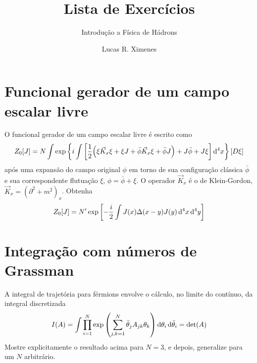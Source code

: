 \documentclass[a4paper, 11pt, oneside]{impression}
\title{Lista de Exercícios} %
\subtitle{Introdução a Física de Hádrons} %
\author{Lucas R. Ximenes} %
\begin{document}
\maketitle

\chapter{Funcional gerador de um campo escalar livre}\label{quest: one}

\begin{exercise}{}
    O funcional gerador de um campo escalar livre é escrito como
        \begin{equation*}
            Z_{0}[J] = N \int \exp\qty{
                i \int \qty[
                    \dfrac{1}{2}\qty(
                        \xi\vec{K}_{x}\xi +
                        \xi J +
                        \bar{\phi}\vec{K}_{x}\xi + 
                        \bar{\phi}J
                    ) + 
                    J\bar{\phi} + 
                    J\xi
                ]\dd[4]{x}
            }[D\xi]
        \end{equation*}
    após uma expansão do campo original $\phi$ em torno de sua configuração clássica $\bar{\phi}$ e sua correspondente flutuação $\xi$, $\phi = \bar{\phi} + \xi$. O operador $\vec{K}_{x}$ é o de Klein-Gordon, $\vec{K}_{x} = (\partial^{2} + m^{2})_{x}$. Obtenha
        \begin{equation*}
            Z_{0}[J] = N'\exp\qty[
                -\dfrac{i}{2}\int J(x)\Delta(x-y)J(y)\dd[4]{x}\dd[4]{y}
            ]
        \end{equation*}
\end{exercise}



\chapter{Integração com números de Grassman}\label{quest: two}

\begin{exercise}{}
    A integral de trajetória para férmions envolve o cálculo, no limite do contínuo, da integral discretizada
        \begin{equation*}
            I(A) = \int \prod_{i=1}^{N} \exp\qty(\sum_{j,k=1}^{N}\bar{\theta}_{j}A_{jk}\theta_{k})\dd{\theta_{i}}\dd{\bar{\theta}_{i}} = \text{det}(A)
        \end{equation*}
    Mostre explicitamente o resultado acima para $N = 3$, e depois, generalize para um $N$ arbitrário.
\end{exercise}
\end{document}

